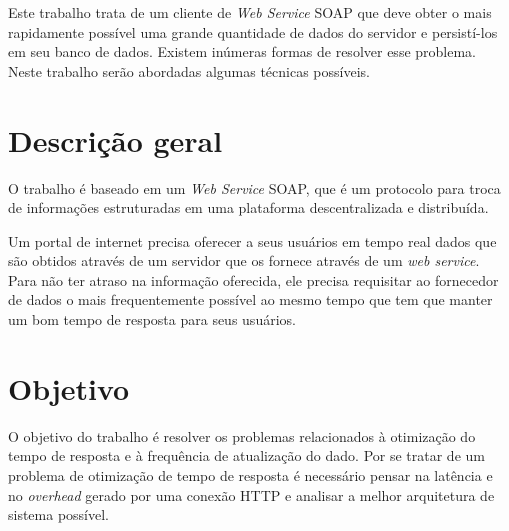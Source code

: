 
\label{Cap:introducao}

Este trabalho trata de um cliente de \textit{Web Service} SOAP que deve obter o mais rapidamente possível uma grande quantidade de dados do servidor e persistí-los em seu banco de dados. Existem inúmeras formas de resolver esse problema. Neste trabalho serão abordadas algumas técnicas possíveis.

\section{Descrição geral}

O trabalho é baseado em um \textit{Web Service} SOAP, que é um protocolo para troca de informações estruturadas em uma plataforma descentralizada e distribuída.

Um portal de internet precisa oferecer a seus usuários em tempo real dados que são obtidos através de um servidor que os fornece através de um \textit{web service}. Para não ter atraso na informação oferecida, ele precisa requisitar ao fornecedor de dados o mais frequentemente possível ao mesmo tempo que tem que manter um bom tempo de resposta para seus usuários.

\section{Objetivo}

O objetivo do trabalho é resolver os problemas relacionados à otimização do tempo de resposta e à frequência de atualização do dado. Por se tratar de um problema de otimização de tempo de resposta é necessário pensar na latência e no \textit{overhead} gerado por uma conexão HTTP e analisar a melhor arquitetura de sistema possível.

